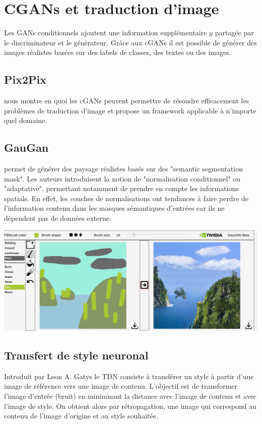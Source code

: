 \documentclass[a4paper, 12pt]{book}
\begin{document}
\section{CGANs et traduction d'image}

Les GANs conditionnels ajoutent une information supplémentaire $y$ partagée par le discriminateur et le générateur. Grâce aux cGANs il est possible de générer des images réalistes basées sur des labels de classes, des textes ou des images.

\subsection{Pix2Pix}
\cite{DBLP:journals/corr/GatysEB15a} nous montre en quoi les cGANs peuvent permettre de résoudre efficacement les problèmes de traduction d'image et propose un framework applicable à n'importe quel domaine.

\subsection{GauGan}
\cite{DBLP:journals/corr/abs-1903-07291} permet de générer des paysage réalistes basés sur des "semantic segmentation mask". Les auteurs introduisent la notion de "normalisation conditionnel" ou "adaptative",  permettant notamment de prendre en compte les informations spatials.
En effet, les couches de normalisations ont tendances à faire perdre de l'information contenu dans les masques sémantiques d'entrées car ils ne dépendent pas de données externe.

\begin{center}
\includegraphics[width=0.7\linewidth]{images/test-gaugan.png}
\label{fig-gaugan}
\end{center}

\subsection{Transfert de style neuronal} 
Introduit par Leon A. Gatys \cite{DBLP:journals/corr/GatysEB15a} le TDN consiste à transférer un style à partir d'une image de référence vers une image de contenu. L'objectif est de transformer l'image d'entrée (bruit) en minimisant la distance avec l'image de contenu et avec l'image de style. On obtient alors par rétropagation, une image qui correspond au contenu de l'image d'origine et au style souhaitée.
\end{document}
